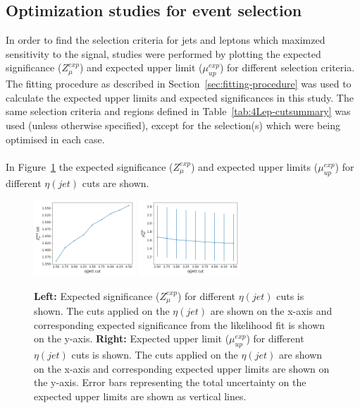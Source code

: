 \subsection{Optimization studies for event selection}
\label{sec:optimization-studies-tetra}
In order to find the selection criteria for jets and leptons which maximzed sensitivity to the \tWZ signal, studies were performed by plotting the expected significance ($Z_{\mu}^{exp}$) and expected upper limit ($\mu_{up}^{exp}$) for different selection criteria. The fitting procedure as described in Section~\ref{sec:fitting-procedure} was used to calculate the expected upper limits and expected significances in this study. The same selection criteria and regions defined in Table~\ref{tab:4Lep-cutsummary} was used (unless otherwise specified), except for the selection(s) which were being optimised in each case.  \\\\

In Figure~\ref{fig:4lep-jetEta-optimisation} the expected significance ($Z_{\mu}^{exp}$) and expected upper limits ($\mu_{up}^{exp}$) for different $\eta(jet)$ cuts are shown. 
\begin{figure}[h!]
	\includegraphics[width = 0.34\textwidth]{figures/signif_jetEta.png}
  	\includegraphics[width = 0.34\textwidth]{figures/exp_upper_jetEta.png}
  \centering
	\caption{\textbf{Left:} Expected significance ($Z_{\mu}^{exp}$) for different $\eta(jet)$ cuts is shown. The cuts applied on the $\eta(jet)$ are shown on the x-axis and corresponding expected significance from the likelihood fit is shown on the y-axis. \textbf{Right:} Expected upper limit ($\mu_{up}^{exp}$) for different $\eta(jet)$ cuts is shown. The cuts applied on the $\eta(jet)$ are shown on the x-axis and corresponding expected upper limits are shown on the y-axis. Error bars representing the total uncertainty on the expected upper limits are shown as vertical lines.}
	\label{fig:4lep-jetEta-optimisation}
\end{figure}


